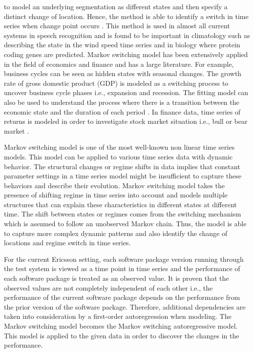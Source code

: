 to model an underlying segmentation as different states and then specify
a distinct change of location. Hence, the method is able to identify
a switch in time series when change point occurs \citep{luong2012hidden}.
This method is used in almost all current systems in speech recognition
\citep{rabiner1989tutorial} and is found to be important in climatology
such as describing the state in the wind speed time series \citep{ailliot2012markov}
and in biology \citep{stanke2003gene} where protein coding genes
are predicted. Markov switching model has been extensively applied
in the field of economics and finance and has a large literature.
For example, business cycles can be seen as hidden states with seasonal
changes. The growth rate of gross domestic product (GDP) is modeled
as a switching process to uncover business cycle phases i.e., expansion
and recession. The fitting model can also be used to understand the
process where there is a transition between the economic state and
the duration of each period \citep{hamilton1989new}. In finance data,
time series of returns is modeled in order to investigate stock market
situation i.e., bull or bear market \citep{kim1998testing}. 

Markov switching model is one of the most well-known non linear time
series models. This model can be applied to various time series data
with dynamic behavior. The structural changes or regime shifts in
data implies that constant parameter settings in a time series model
might be insufficient to capture these behaviors and describe their
evolution. Markov switching model takes the presence of shifting regime
in time series into account and models multiple structures that can
explain these characteristics in different states at different time.
The shift between states or regimes comes from the switching mechanism
which is assumed to follow an unobserved Markov chain. Thus, the model
is able to capture more complex dynamic patterns and also identify
the change of locations and regime switch in time series. 

For the current Ericsson setting, each software package version running
through the test system is viewed as a time point in time series and
the performance of each software package is treated as an observed
value. It is proven that the observed values are not completely independent
of each other i.e., the performance of the current software package
depends on the performance from the prior version of the software
package. Therefore, additional dependencies are taken into consideration
by a first-order autoregression when modeling. The Markov switching
model becomes the Markov switching autoregressive model. This model
is applied to the given data in order to discover the changes in the
performance.

